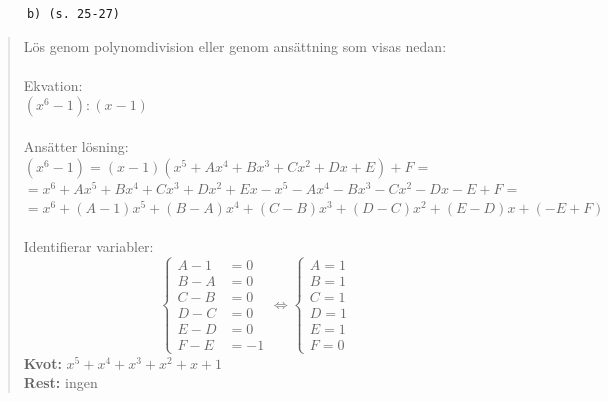 \documentclass[a4paper]{article}
\newcommand{\tskcol}[1]{\textcolor{tskcol}{#1}}
\begin{document}
	\texttt{\tskcol{~~~~~~b) (s. 25-27)}}
	\begin{quotation}
		\noindent
		Lös genom polynomdivision eller genom ansättning som visas nedan: \\ \\
		Ekvation: \\
		$(x^6-1):(x-1)$ \\ \\
		Ansätter lösning: \\
		$(x^6-1)=(x-1)(x^5+Ax^4+Bx^3+Cx^2+Dx+E)+F=$ \\
		$=x^6+Ax^5+Bx^4+Cx^3+Dx^2+Ex-x^5-Ax^4-Bx^3-Cx^2-Dx-E+F=$ \\
		$=x^6+(A-1)x^5+(B-A)x^4+(C-B)x^3+(D-C)x^2+(E-D)x+(-E+F)$ \\ \\
		Identifierar variabler:\\
		\[\begin{cases} 
		A-1&=0 \\ 
		B-A&=0 \\ 
		C-B&=0 \\
		D-C&=0 \\
		E-D&=0 \\
		F-E&=-1
		\end{cases}
		\Leftrightarrow
		\begin{cases} 
		A=1 \\ 
		B=1 \\
		C=1 \\
		D=1 \\
		E=1 \\
		F=0
		\end{cases}\]
		\textbf{Kvot:} $x^5+x^4+x^3+x^2+x+1$ \\
		\textbf{Rest:} ingen
	\end{quotation}
	
\end{document}
